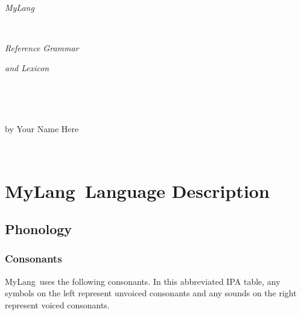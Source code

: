 \documentclass[oneside]{book}
\newcommand{\LanguageName}{MyLang}
\newcommand{\LanguageCreator}{Your Name Here}
\begin{document}
\setmainfont[Ligatures=TeX]{DejaVu Sans}

\begin{center}
\Huge

{\ }

\vfil

\textsl{\LanguageName}

{\ }

\textsl{Reference Grammar}

\textsl{and Lexicon}

{\ }

{\ }

\Large

by \LanguageCreator

\vfil

{\ }
\end{center}

\vfil

\eject

\chapter{\LanguageName\ Language Description}

\section{Phonology}


\eject

\subsection{Consonants}

\LanguageName\ uses the following consonants.
In this abbreviated {\fontsize{8pt}{8pt}\selectfont IPA} table, any symbols on the left represent unvoiced consonants and any sounds on the right represent voiced consonants.
\end{document}

